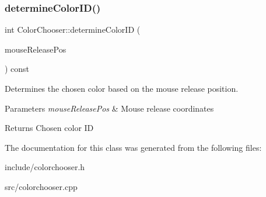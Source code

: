\subsubsection{\texorpdfstring{determine\+Color\+I\+D()}{determineColorID()}}
{\footnotesize\ttfamily int Color\+Chooser\+::determine\+Color\+ID (\begin{DoxyParamCaption}\item[{Q\+PointF \&}]{mouse\+Release\+Pos }\end{DoxyParamCaption}) const}



Determines the chosen color based on the mouse release position. 


\begin{DoxyParams}{Parameters}
{\em mouse\+Release\+Pos} & Mouse release coordinates \\
\hline
\end{DoxyParams}
\begin{DoxyReturn}{Returns}
Chosen color ID 
\end{DoxyReturn}


The documentation for this class was generated from the following files\+:\begin{DoxyCompactItemize}
\item 
include/colorchooser.\+h\item 
src/colorchooser.\+cpp\end{DoxyCompactItemize}
